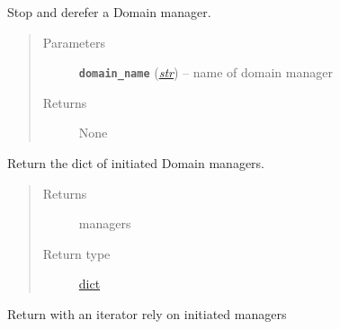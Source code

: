 \documentclass[letterpaper,10pt,english]{sphinxmanual}
\begin{document}
\begin{fulllineitems}
\begin{fulllineitems}
\label{adapt/adaptation:escape.adapt.adaptation.DomainConfigurator.stop}
Stop and derefer a Domain manager.
\begin{quote}\begin{description}
\item[{Parameters}] \leavevmode
\textbf{\texttt{domain\_name}} (\href{https://docs.python.org/2.7/library/functions.html\#str}{\emph{str}}) -- name of domain manager

\item[{Returns}] \leavevmode
None

\end{description}\end{quote}

\end{fulllineitems}


\begin{fulllineitems}
\label{adapt/adaptation:escape.adapt.adaptation.DomainConfigurator.components}
Return the dict of initiated Domain managers.
\begin{quote}\begin{description}
\item[{Returns}] \leavevmode
managers

\item[{Return type}] \leavevmode
\href{https://docs.python.org/2.7/library/stdtypes.html\#dict}{dict}

\end{description}\end{quote}

\end{fulllineitems}


\begin{fulllineitems}
\label{adapt/adaptation:escape.adapt.adaptation.DomainConfigurator.__iter__}
Return with an iterator rely on initiated managers

\end{fulllineitems}



\end{fulllineitems}
\end{document}
